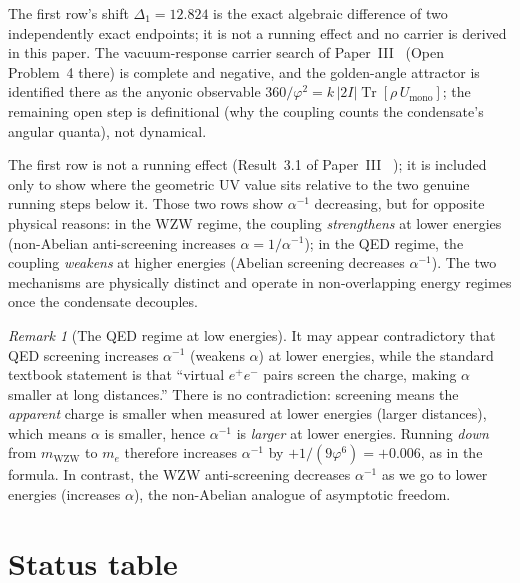 \documentclass[11pt,a4paper]{article}
\theoremstyle{definition}
\theoremstyle{remark}
\newtheorem{remark}[theorem]{Remark}
\newcommand{\vp}{\varphi}
\newcommand{\aInv}{\alpha^{-1}}
\newcommand{\mWZW}{m_{\mathrm{WZW}}}
\begin{document}
\noindent
The first row's shift $\Delta_1 = 12.824$ is the exact algebraic
difference of two independently exact endpoints; it is not a running
effect and no carrier is derived in this paper. The vacuum-response
carrier search of Paper~III~\cite{Paper3} (Open Problem~4 there) is
complete and negative, and the golden-angle attractor is identified
there as the anyonic observable
$360/\vp^2 = k\,|2I|\operatorname{Tr}[\rho\,U_{\mathrm{mono}}]$; the
remaining open step is definitional (why the coupling counts the
condensate's angular quanta), not dynamical.

\noindent
The first row is not a running effect (Result~3.1 of Paper~III~\cite{Paper3}%
); it is included only to show where the geometric UV value sits
relative to the two genuine running steps below it.  Those two rows
show $\aInv$ decreasing, but for opposite physical reasons:
in the WZW regime, the coupling \emph{strengthens} at lower energies
(non-Abelian anti-screening increases $\alpha = 1/\aInv$); in the QED
regime, the coupling \emph{weakens} at higher energies (Abelian screening
decreases $\aInv$).  The two mechanisms are physically distinct and
operate in non-overlapping energy regimes once the condensate decouples.

\begin{remark}[The QED regime at low energies]
\label{P4:rem:qed_regime_clarification}
It may appear contradictory that QED screening increases $\aInv$
(weakens $\alpha$) at lower energies, while the standard textbook statement
is that ``virtual $e^+e^-$ pairs screen the charge, making $\alpha$
smaller at long distances.''  There is no contradiction: screening means
the \emph{apparent} charge is smaller when measured at lower energies
(larger distances), which means $\alpha$ is smaller, hence $\aInv$ is
\emph{larger} at lower energies.  Running \emph{down} from $\mWZW$ to $m_e$
therefore increases $\aInv$ by $+1/(9\vp^6) = +0.006$, as in the formula.
In contrast, the WZW anti-screening decreases $\aInv$ as we go to lower
energies (increases $\alpha$), the non-Abelian analogue of asymptotic
freedom.
\end{remark}

\newpage
\section{Status table}
\label{P4:sec:status}
\end{document}
